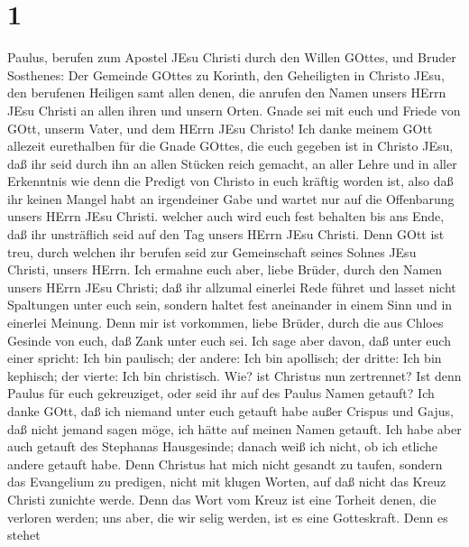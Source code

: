 \hypertarget{section}{%
\section{1}\label{section}}

 Paulus, berufen zum Apostel JEsu Christi durch den Willen
GOttes, und Bruder Sosthenes:  Der Gemeinde GOttes zu
Korinth, den Geheiligten in Christo JEsu, den berufenen Heiligen samt
allen denen, die anrufen den Namen unsers HErrn JEsu Christi an allen
ihren und unsern Orten.  Gnade sei mit euch und Friede von
GOtt, unserm Vater, und dem HErrn JEsu Christo!  Ich danke
meinem GOtt allezeit eurethalben für die Gnade GOttes, die euch gegeben
ist in Christo JEsu,  daß ihr seid durch ihn an allen
Stücken reich gemacht, an aller Lehre und in aller Erkenntnis
 wie denn die Predigt von Christo in euch kräftig worden
ist,  also daß ihr keinen Mangel habt an irgendeiner Gabe
und wartet nur auf die Offenbarung unsers HErrn JEsu Christi.
 welcher auch wird euch fest behalten bis ans Ende, daß ihr
unsträflich seid auf den Tag unsers HErrn JEsu Christi. 
Denn GOtt ist treu, durch welchen ihr berufen seid zur Gemeinschaft
seines Sohnes JEsu Christi, unsers HErrn.  Ich ermahne euch
aber, liebe Brüder, durch den Namen unsers HErrn JEsu Christi; daß ihr
allzumal einerlei Rede führet und lasset nicht Spaltungen unter euch
sein, sondern haltet fest aneinander in einem Sinn und in einerlei
Meinung.  Denn mir ist vorkommen, liebe Brüder, durch die
aus Chloes Gesinde von euch, daß Zank unter euch sei.  Ich
sage aber davon, daß unter euch einer spricht: Ich bin paulisch; der
andere: Ich bin apollisch; der dritte: Ich bin kephisch; der vierte: Ich
bin christisch.  Wie? ist Christus nun zertrennet? Ist denn
Paulus für euch gekreuziget, oder seid ihr auf des Paulus Namen getauft?
 Ich danke GOtt, daß ich niemand unter euch getauft habe
außer Crispus und Gajus,  daß nicht jemand sagen möge, ich
hätte auf meinen Namen getauft.  Ich habe aber auch getauft
des Stephanas Hausgesinde; danach weiß ich nicht, ob ich etliche andere
getauft habe.  Denn Christus hat mich nicht gesandt zu
taufen, sondern das Evangelium zu predigen, nicht mit klugen Worten, auf
daß nicht das Kreuz Christi zunichte werde.  Denn das Wort
vom Kreuz ist eine Torheit denen, die verloren werden; uns aber, die wir
selig werden, ist es eine Gotteskraft.  Denn es stehet
